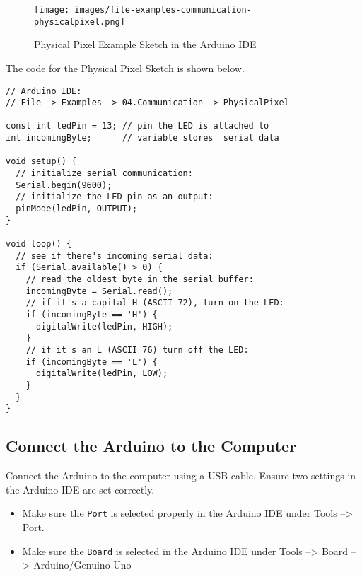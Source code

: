 \documentclass{book}
\makeatletter
\def\maxwidth{\ifdim\Gin@nat@width>\linewidth\linewidth
\else\Gin@nat@width\fi}
\let\Oldincludegraphics\includegraphics
\renewcommand{\includegraphics}[1]{\Oldincludegraphics[width=.8\maxwidth]{#1}}
\providecommand{\tightlist}{%
      \setlength{\itemsep}{0pt}\setlength{\parskip}{0pt}}
\newcommand{\passthrough}[1]{#1}
\makeatother
\begin{document}
\begin{figure}
\centering
\texttt{[image: images/file-examples-communication-physicalpixel.png]}
\caption{Physical Pixel Example Sketch in the Arduino IDE}
\end{figure}

The code for the Physical Pixel Sketch is shown below.
    




    
        \begin{lstlisting}
// Arduino IDE: 
// File -> Examples -> 04.Communication -> PhysicalPixel

const int ledPin = 13; // pin the LED is attached to
int incomingByte;      // variable stores  serial data

void setup() {
  // initialize serial communication:
  Serial.begin(9600);
  // initialize the LED pin as an output:
  pinMode(ledPin, OUTPUT);
}

void loop() {
  // see if there's incoming serial data:
  if (Serial.available() > 0) {
    // read the oldest byte in the serial buffer:
    incomingByte = Serial.read();
    // if it's a capital H (ASCII 72), turn on the LED:
    if (incomingByte == 'H') {
      digitalWrite(ledPin, HIGH);
    }
    // if it's an L (ASCII 76) turn off the LED:
    if (incomingByte == 'L') {
      digitalWrite(ledPin, LOW);
    }
  }
}
\end{lstlisting}
    




    
        \hypertarget{connect-the-arduino-to-the-computer}{%
\subsection{Connect the Arduino to the
Computer}\label{connect-the-arduino-to-the-computer}}
    




    
        Connect the Arduino to the computer using a USB cable. Ensure two
settings in the Arduino IDE are set correctly.

\begin{itemize}
\tightlist
\item
  Make sure the \passthrough{\lstinline!Port!} is selected properly in
  the Arduino IDE under Tools --\textgreater{} Port.
\item
  Make sure the \passthrough{\lstinline!Board!} is selected in the
  Arduino IDE under Tools --\textgreater{} Board --\textgreater{}
  Arduino/Genuino Uno
\end{itemize}
\end{document}
